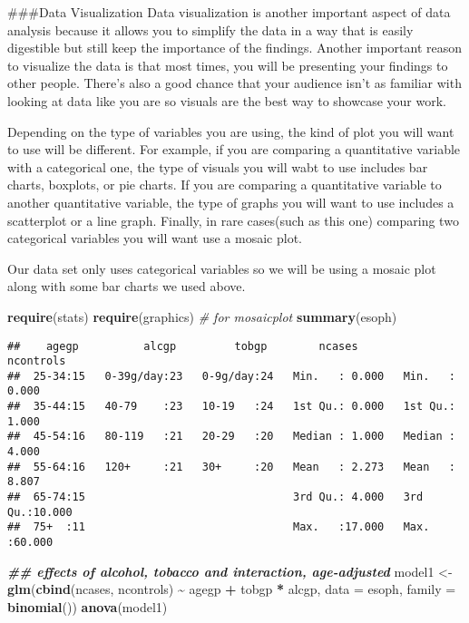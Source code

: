 \documentclass[
]{article}
\newenvironment{Shaded}{\begin{snugshade}}{\end{snugshade}}
\newcommand{\AttributeTok}[1]{\textcolor[rgb]{0.13,0.29,0.53}{#1}}
\newcommand{\CommentTok}[1]{\textcolor[rgb]{0.56,0.35,0.01}{\textit{#1}}}
\newcommand{\DocumentationTok}[1]{\textcolor[rgb]{0.56,0.35,0.01}{\textbf{\textit{#1}}}}
\newcommand{\FunctionTok}[1]{\textcolor[rgb]{0.13,0.29,0.53}{\textbf{#1}}}
\newcommand{\NormalTok}[1]{#1}
\newcommand{\OtherTok}[1]{\textcolor[rgb]{0.56,0.35,0.01}{#1}}
\newcommand{\SpecialCharTok}[1]{\textcolor[rgb]{0.81,0.36,0.00}{\textbf{#1}}}
\begin{document}
\#\#\#Data Visualization Data visualization is another important aspect
of data analysis because it allows you to simplify the data in a way
that is easily digestible but still keep the importance of the findings.
Another important reason to visualize the data is that most times, you
will be presenting your findings to other people. There's also a good
chance that your audience isn't as familiar with looking at data like
you are so visuals are the best way to showcase your work.

Depending on the type of variables you are using, the kind of plot you
will want to use will be different. For example, if you are comparing a
quantitative variable with a categorical one, the type of visuals you
will wabt to use includes bar charts, boxplots, or pie charts. If you
are comparing a quantitative variable to another quantitative variable,
the type of graphs you will want to use includes a scatterplot or a line
graph. Finally, in rare cases(such as this one) comparing two
categorical variables you will want use a mosaic plot.

Our data set only uses categorical variables so we will be using a
mosaic plot along with some bar charts we used above.

\begin{Shaded}
\begin{Highlighting}[]
\FunctionTok{require}\NormalTok{(stats)}
\FunctionTok{require}\NormalTok{(graphics) }\CommentTok{\# for mosaicplot}
\FunctionTok{summary}\NormalTok{(esoph)}
\end{Highlighting}
\end{Shaded}

\begin{verbatim}
##    agegp          alcgp         tobgp        ncases         ncontrols     
##  25-34:15   0-39g/day:23   0-9g/day:24   Min.   : 0.000   Min.   : 0.000  
##  35-44:15   40-79    :23   10-19   :24   1st Qu.: 0.000   1st Qu.: 1.000  
##  45-54:16   80-119   :21   20-29   :20   Median : 1.000   Median : 4.000  
##  55-64:16   120+     :21   30+     :20   Mean   : 2.273   Mean   : 8.807  
##  65-74:15                                3rd Qu.: 4.000   3rd Qu.:10.000  
##  75+  :11                                Max.   :17.000   Max.   :60.000
\end{verbatim}

\begin{Shaded}
\begin{Highlighting}[]
\DocumentationTok{\#\# effects of alcohol, tobacco and interaction, age{-}adjusted}
\NormalTok{model1 }\OtherTok{\textless{}{-}} \FunctionTok{glm}\NormalTok{(}\FunctionTok{cbind}\NormalTok{(ncases, ncontrols) }\SpecialCharTok{\textasciitilde{}}\NormalTok{ agegp }\SpecialCharTok{+}\NormalTok{ tobgp }\SpecialCharTok{*}\NormalTok{ alcgp,}
              \AttributeTok{data =}\NormalTok{ esoph, }\AttributeTok{family =} \FunctionTok{binomial}\NormalTok{())}
\FunctionTok{anova}\NormalTok{(model1)}
\end{Highlighting}
\end{Shaded}
\end{document}
